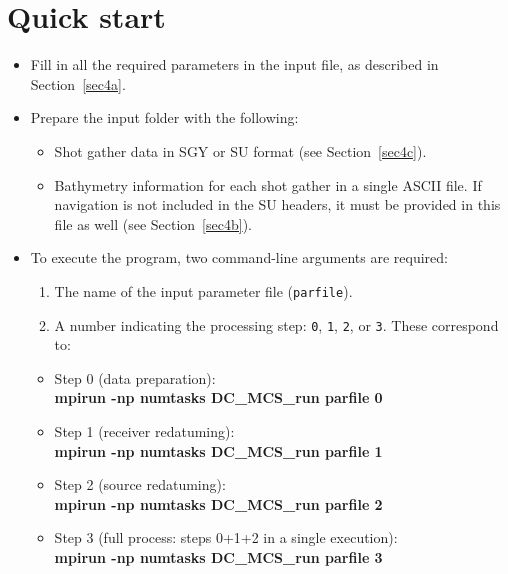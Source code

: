\documentclass[11pt, oneside]{article}   	%
\begin{document}
\section{Quick start}\label{sec3}

\begin{itemize}
    \item Fill in all the required parameters in the input file, as described in Section~\ref{sec4a}.
    
    \item Prepare the input folder with the following:
    \begin{itemize}
        \item Shot gather data in SGY or SU format (see Section~\ref{sec4c}).
        \item Bathymetry information for each shot gather in a single ASCII file. If navigation is not included in the SU headers, it must be provided in this file as well (see Section~\ref{sec4b}).
    \end{itemize}
    
    \item To execute the program, two command-line arguments are required:
    \begin{enumerate}
        \item The name of the input parameter file (\texttt{parfile}).
        \item A number indicating the processing step: \texttt{0}, \texttt{1}, \texttt{2}, or \texttt{3}. These correspond to:
    \end{enumerate}

    \begin{itemize}
        \item Step 0 (data preparation):\\
        \textbf{mpirun -np numtasks DC\_MCS\_run parfile 0}
        
        \item Step 1 (receiver redatuming):\\
        \textbf{mpirun -np numtasks DC\_MCS\_run parfile 1}
        
        \item Step 2 (source redatuming):\\
        \textbf{mpirun -np numtasks DC\_MCS\_run parfile 2}
        
        \item Step 3 (full process: steps 0+1+2 in a single execution):\\
        \textbf{mpirun -np numtasks DC\_MCS\_run parfile 3}
    \end{itemize}


\end{itemize}
\end{document}
